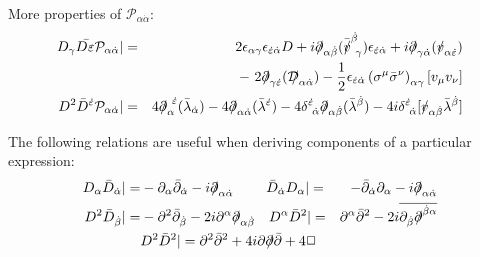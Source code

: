 \documentclass[a4paper,12pt]{article}
\newcommand{\slashed}[1]{\hbox{{$#1$}\llap{$/$}}}
\begin{document}
  More properties of 
$ \mathcal{P}_{\alpha\dot{\alpha}} $:
\begin{eqnarray*}
    D_\gamma \bar{D_{\dot{\varepsilon}}} \mathcal{P}_{\alpha\dot{\alpha}} | & = &
 2 \epsilon_{\alpha\gamma} \epsilon_{\dot{\varepsilon}\dot{\alpha}} D 
  + i \slashed{\partial}_{\alpha\dot{\beta}} ( \bar{\slashed{v}}^{\dot{\beta}}_{~\gamma} )
                \epsilon_{\dot{\varepsilon}\dot{\alpha}} 
  + i \slashed{\partial}_{\gamma\dot{\alpha}} ( \slashed{v}_{\alpha\dot{\varepsilon}} ) \\
  && 
  -~ 2 \slashed{\partial}_{\gamma\dot{{\varepsilon}}}
          (\slashed{\mathcal{D}}_{\alpha\dot{\alpha}} )
  - \frac{1}{2} \epsilon_{\dot{\varepsilon}\dot{\alpha}}
                \left( \sigma^\mu \bar{\sigma}^\nu \right)_{\alpha\gamma}
                [v_\mu v_\nu] \\
   D^2 \bar{D}^{\dot{\varepsilon}} \mathcal{P}_{\alpha\dot{\alpha}} | & = &
   4 \slashed{\partial}_\alpha^{~\dot{\varepsilon}} 
            ( \bar{\lambda}_{\dot{\alpha}} ) 
 - 4 \slashed{\partial}_{\alpha\dot{\alpha}} 
            ( \bar{\lambda}^{\dot{\varepsilon}} ) 
 - 4 \delta^{\dot{\varepsilon}}_{~\dot{\alpha}}
            \slashed{\partial}_{\alpha\dot{\beta}}
            (\bar{\lambda}^{\dot{\beta}} ) 
 - 4 i \delta^{\dot{\varepsilon}}_{~\dot{\alpha}} 
            [ \slashed{v}_{\alpha\dot{\beta}} \bar{\lambda}^{\dot{\beta}} ]
\end{eqnarray*}

  The following relations are useful when deriving components of a particular
expression:
\begin{eqnarray*}
  D_\alpha \bar{D}_{\dot{\alpha}} | = &
       - \partial_\alpha \bar{\partial}_{\dot{\alpha}} 
       - i \slashed{\partial}_{\alpha{\dot{\alpha}}} 
  ~~~~~~~
  \bar{D}_{\dot{\alpha}}D_\alpha | = &
       - \bar{\partial}_{\dot{\alpha}} \partial_\alpha
       - i \slashed{\partial}_{\alpha{\dot{\alpha}}} \\
  D^2 \bar{D}_{\dot{\beta}} | = &
       - \partial^2 \bar{\partial}_{\dot{\beta}} 
       - 2 i \partial^\alpha \slashed{\partial}_{\alpha\dot{\beta}}
  ~~~
  D^\alpha \bar{D}^2 | =  &
       \partial^\alpha \bar{\partial}^2  
       - 2 i \overline{\partial_{\dot{\beta}}
                       \slashed{\partial}^{\dot{\beta}\alpha}} \\
  & D^2 \bar{D}^2 | =
          \partial^2 \bar{\partial}^2  
    + 4 i \partial \slashed{\partial} \bar{\partial} 
    + 4 \Box &
\end{eqnarray*}
\end{document}
